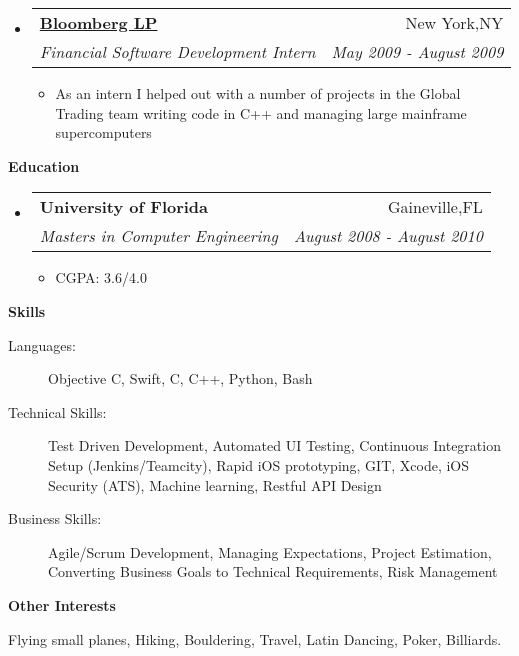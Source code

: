 \documentclass[letterpaper,11pt]{article}
\makeatletter
\newcommand{\resitem}[1]{\item #1 \vspace{-2pt}}
\newcommand{\resheading}[1]{{\large \colorbox{mygrey}{\begin{minipage}{\textwidth}{\textbf{#1 \vphantom{p\^{E}}}}\end{minipage}}}}
\newcommand{\ressubheading}[4]{
\begin{tabular*}{7.0in}{l@{\extracolsep{\fill}}r}
    \textbf{#1} & #2 \\
    \textit{#3} & \textit{#4} \\
\end{tabular*}\vspace{-6pt}}
\makeatother
\begin{document}
\begin{itemize}
\item
    \ressubheading{\href{http://www.bloomberg.com}{Bloomberg LP}}{New York,NY}{Financial Software Development Intern}{May 2009 - August 2009}
    \begin{itemize}
      \resitem{As an intern I helped out with a number of projects in the Global Trading team writing code in C++ and managing large mainframe supercomputers}
    \end{itemize}
    
    
\end{itemize}

\vspace{0.2in}
  
\resheading{Education}
\begin{itemize}
\item
    \ressubheading{University of Florida}{Gaineville,FL}{{Masters in Computer Engineering}}{August 2008 - August 2010}
    \begin{itemize}
        \resitem{CGPA: 3.6/4.0}
    \end{itemize}
\end{itemize}

\vspace{0.2in}

\resheading{Skills}
\begin{description}
\item[Languages:]
Objective C, Swift, C, C++, Python, Bash
\item[Technical Skills:] Test Driven Development, Automated UI Testing, Continuous Integration Setup (Jenkins/Teamcity), Rapid iOS prototyping, GIT, Xcode, iOS Security (ATS),
Machine learning, Restful API Design
\item[Business Skills:]
Agile/Scrum Development, Managing Expectations, Project Estimation, Converting Business Goals to Technical Requirements, Risk Management
\end{description}

\vspace{0.2in}

\resheading{Other Interests}
\begin{description}
\item Flying small planes, Hiking, Bouldering, Travel, Latin Dancing, Poker, Billiards.
\end{description}
\end{document}
